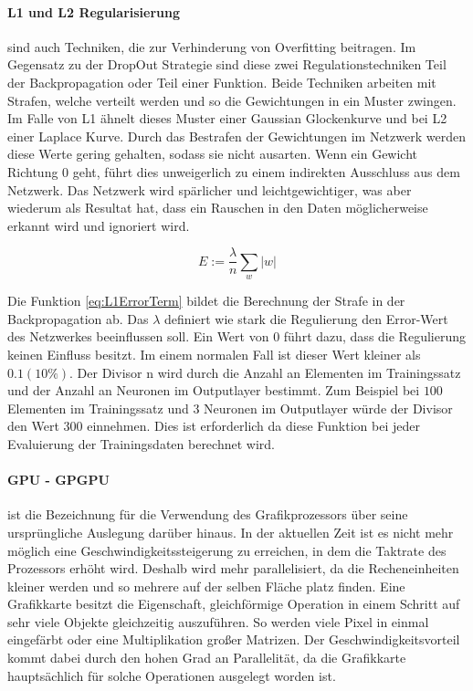 \paragraph{L1 und L2 Regularisierung} sind auch Techniken, die zur Verhinderung von Overfitting beitragen.
Im Gegensatz zu der DropOut Strategie sind diese zwei Regulationstechniken Teil der Backpropagation oder Teil einer Funktion.
Beide Techniken arbeiten mit Strafen, welche verteilt werden und so die Gewichtungen in ein Muster zwingen. 
Im Falle von L1 ähnelt dieses Muster einer Gaussian Glockenkurve und bei L2 einer Laplace Kurve.
Durch das Bestrafen der Gewichtungen im Netzwerk werden diese Werte gering gehalten, sodass sie nicht ausarten. 
Wenn ein Gewicht Richtung $0$ geht, führt dies unweigerlich zu einem indirekten Ausschluss aus dem Netzwerk.
Das Netzwerk wird spärlicher und leichtgewichtiger, was aber wiederum als Resultat hat, dass ein Rauschen in den Daten möglicherweise erkannt wird und ignoriert wird.

\begin{equation}
	E := \frac{\lambda}{n} \sum\limits_{w}|w|
	\label{eq:L1ErrorTerm}
\end{equation}

Die Funktion \ref{eq:L1ErrorTerm} bildet die Berechnung der Strafe in der Backpropagation ab.
Das $\lambda$ definiert wie stark die Regulierung den Error-Wert des Netzwerkes beeinflussen soll.
Ein Wert von $0$ führt dazu, dass die Regulierung keinen Einfluss besitzt. 
Im einem normalen Fall ist dieser Wert kleiner als $0.1 (10\%)$.
Der Divisor n wird durch die Anzahl an Elementen im Trainingssatz und der Anzahl an Neuronen im Outputlayer bestimmt.
Zum Beispiel bei $100$ Elementen im Trainingssatz und $3$ Neuronen im Outputlayer würde der Divisor den Wert $300$ einnehmen.
Dies ist erforderlich da diese Funktion bei jeder Evaluierung der Trainingsdaten berechnet wird.

\paragraph{GPU - GPGPU} ist die Bezeichnung für die Verwendung des Grafikprozessors über seine ursprüngliche Auslegung darüber hinaus.
In der aktuellen Zeit ist es nicht mehr möglich eine Geschwindigkeitssteigerung zu erreichen, in dem die Taktrate des Prozessors erhöht wird. 
Deshalb wird mehr parallelisiert, da die Recheneinheiten kleiner werden und so mehrere auf der selben Fläche platz finden. 
Eine Grafikkarte besitzt die Eigenschaft, gleichförmige Operation in einem Schritt auf sehr viele Objekte gleichzeitig auszuführen. 
So werden viele Pixel in einmal eingefärbt oder eine Multiplikation großer Matrizen. 
Der Geschwindigkeitsvorteil kommt dabei durch den hohen Grad an Parallelität, da die Grafikkarte hauptsächlich für solche Operationen ausgelegt worden ist.

